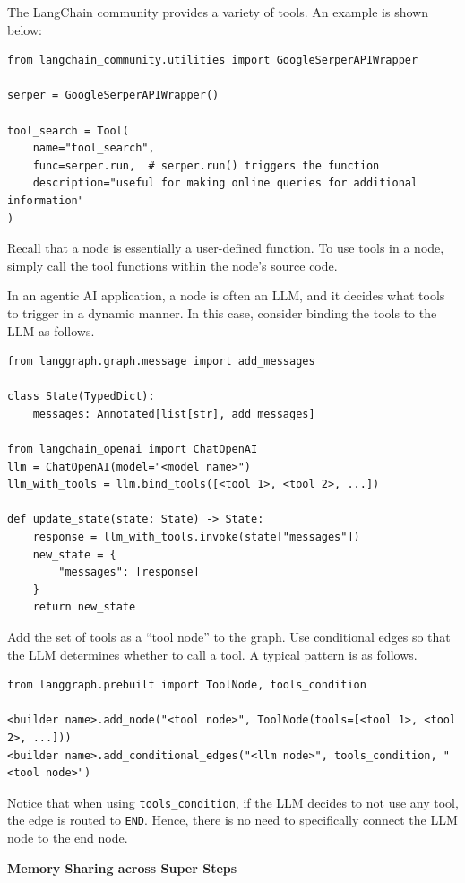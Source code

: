 The LangChain community provides a variety of tools. An example is shown below:
\begin{lstlisting}
from langchain_community.utilities import GoogleSerperAPIWrapper

serper = GoogleSerperAPIWrapper()

tool_search = Tool(
    name="tool_search",
    func=serper.run,  # serper.run() triggers the function
    description="useful for making online queries for additional information"
)
\end{lstlisting}

Recall that a node is essentially a user-defined function. To use tools in a node, simply call the tool functions within the node’s source code.

In an agentic AI application, a node is often an LLM, and it decides what tools to trigger in a dynamic manner. In this case, consider binding the tools to the LLM as follows.
\begin{lstlisting}
from langgraph.graph.message import add_messages

class State(TypedDict):
    messages: Annotated[list[str], add_messages]
    
from langchain_openai import ChatOpenAI
llm = ChatOpenAI(model="<model name>")
llm_with_tools = llm.bind_tools([<tool 1>, <tool 2>, ...])

def update_state(state: State) -> State:
    response = llm_with_tools.invoke(state["messages"])
    new_state = {
        "messages": [response]
    }
    return new_state
\end{lstlisting}

Add the set of tools as a ``tool node'' to the graph. Use conditional edges so that the LLM determines whether to call a tool. A typical pattern is as follows.
\begin{lstlisting}
from langgraph.prebuilt import ToolNode, tools_condition

<builder name>.add_node("<tool node>", ToolNode(tools=[<tool 1>, <tool 2>, ...]))
<builder name>.add_conditional_edges("<llm node>", tools_condition, "<tool node>")
\end{lstlisting}
Notice that when using \verb|tools_condition|, if the LLM decides to not use any tool, the edge is routed to \verb|END|. Hence, there is no need to specifically connect the LLM node to the end node.

\vspace{0.1in}
\noindent \textbf{Memory Sharing across Super Steps}
\vspace{0.1in}

